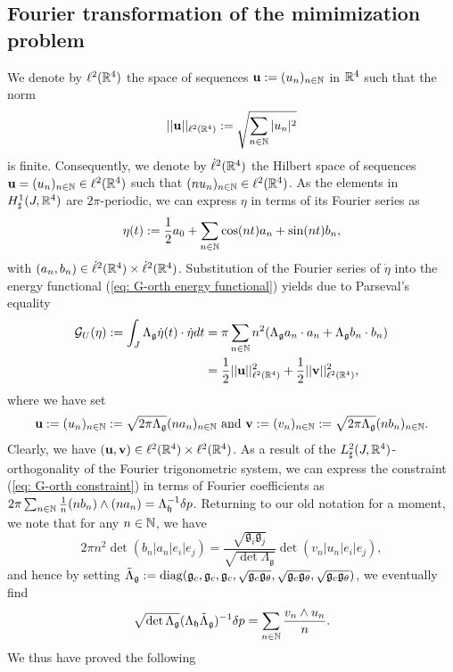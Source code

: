 \subsection{Fourier transformation of the mimimization problem}
We denote by $\ell^2(\mathbb{R}^4)$ the space of sequences $\mathbf{u} := (u_n)_{n \in \mathbb{N}}$ in $\mathbb{R}^4$ such that the norm
\begin{equation}
	||\mathbf{u}||_{\ell^2(\mathbb{R}^4)} := \sqrt{ \sum_{n \in \mathbb{N}} |u_n|^2 }
\end{equation}
is finite. Consequently, we denote by $\dot{\ell}^2(\mathbb{R}^4)$ the Hilbert space of sequences $\mathbf{u} = (u_n)_{n \in \mathbb{N}} \in \ell^2(\mathbb{R}^4)$ such that $(n u_n)_{n \in \mathbb{N}} \in \ell^2(\mathbb{R}^4)$. As the elements in $H_{\sharp}^{1}(J, \mathbb{R}^4)$ are $2\pi$-periodic, we can express $\eta$ in terms of its Fourier series as
\begin{equation}
\eta(t) := \frac{1}{2} a_0 + \sum_{n \in \mathbb{N}} \cos(nt) a_n + \sin(n t) b_n,
\end{equation}
with $(a_n, b_n) \in \dot{\ell}^2(\mathbb{R}^4) \times \dot{\ell}^2(\mathbb{R}^4)$. Substitution of the Fourier series of $\dot{\eta}$ into the energy functional (\ref{eq: G-orth energy functional}) yields due to Parseval's equality
\begin{align}
\mathcal{G}_{U} (\eta) := \int_{J} \Lambda_{\mathfrak{g}} \dot{\eta}(t) \cdot \dot{\eta} dt &= \pi \sum_{n  \in \mathbb{N}} n^2(\Lambda_{\mathfrak{g}} a_n \cdot a_n + \Lambda_{\mathfrak{g}} b_n \cdot b_n)  \\  &=
\frac{1}{2} ||\mathbf{u}||_{\ell^2(\mathbb{R}^4)}^2 + \frac{1}{2} ||\mathbf{v}||_{\ell^2(\mathbb{R}^4)}^2,
\end{align}
where we have set
\begin{align}
	\mathbf{u} := (u_n)_{n \in \mathbb{N}} := \sqrt{2 \pi \Lambda_{\mathfrak{g}}}(n a_n)_{n \in \mathbb{N}} \text{ and } \mathbf{v} := (v_n)_{n \in \mathbb{N}} := \sqrt{2 \pi \Lambda_{\mathfrak{g}}} (n b_n)_{n \in \mathbb{N}}.
\end{align}
Clearly, we have $(\mathbf{u}, \mathbf{v}) \in \ell^2(\mathbb{R}^4) \times \ell^2(\mathbb{R}^4)$. As a result of the $L_{\sharp}^2(J, \mathbb{R}^4)$-orthogonality of the Fourier trigonometric system, we can express the constraint (\ref{eq: G-orth constraint}) in terms of Fourier coefficients as $2 \pi \sum_{n \in \mathbb{N}} \tfrac{1}{n} (nb_n) \wedge (n a_n) = \Lambda_{\mathfrak{h}}^{-1} \delta p$. Returning to our old notation for a moment, we note that for any $n \in \mathbb{N}$, we have
\begin{equation}
2 \pi n^2 \det(b_n | a_n | e_i | e_j) = \frac{\sqrt{\mathfrak{g}_i \mathfrak{g}_j}}{\sqrt{\det \Lambda_{\mathfrak{g}}}} \det(v_n | u_n |e_i | e_j),
\end{equation}
and hence by setting $\tilde{\Lambda}_{\mathfrak{g}} := \operatorname{diag}(\mathfrak{g}_c, \mathfrak{g}_c, \mathfrak{g}_c, \sqrt{\mathfrak{g}_c \mathfrak{g}_{\theta}}, \sqrt{\mathfrak{g}_c \mathfrak{g}_{\theta}}, \sqrt{\mathfrak{g}_c  \mathfrak{g}_{\theta}})$, we eventually find
\begin{equation}
\sqrt{\det \Lambda_{\mathfrak{g}}} (\Lambda_{\mathfrak{h}} \tilde{\Lambda}_{\mathfrak{g}})^{-1} \delta p = \sum_{n \in \mathbb{N}} \frac{v_n  \wedge u_n}{n}.
\end{equation}
We thus have proved the following


